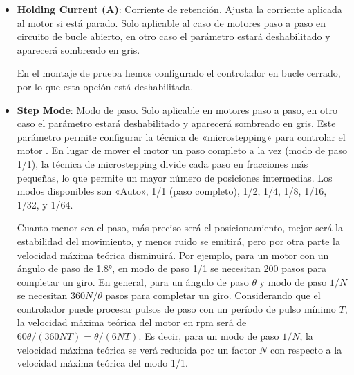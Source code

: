 \documentclass[english,spanish,a4paper,11pt]{article}
\begin{document}
\begin{itemize}
    \begin{admonition}{Importante}
        Al igual que en el parámetro anterior, este parámetro debe ser menor que la corriente máxima que pueda proporcionar la fuente de alimentación, teniendo también en cuenta las demás posibles cargas a las que deba suministrar potencia la fuente.
    \end{admonition}

    En el montaje de prueba, al igual que en el parámetro anterior, hemos establecido valores pequeños en este parámetro: 0.5 A para el motor paso a paso y 1 A para el motor sin escobillas.
    
    \item \textbf{Holding Current (A)}: Corriente de retención. Ajusta la corriente aplicada al motor si está parado. Solo aplicable al caso de motores paso a paso en circuito de bucle abierto, en otro caso el parámetro estará deshabilitado y aparecerá sombreado en gris.

    En el montaje de prueba hemos configurado el controlador en bucle cerrado, por lo que esta opción está deshabilitada.
    
    \item \textbf{Step Mode}: Modo de paso. Solo aplicable en motores paso a paso, en otro caso el parámetro estará deshabilitado y aparecerá sombreado en gris. Este parámetro permite configurar la técnica de «microstepping» para controlar el motor \cite{electricmotorsanddrives,enwiki:1166298756}. En lugar de mover el motor un paso completo a la vez (modo de paso 1/1), la técnica de microstepping divide cada paso en fracciones más pequeñas, lo que permite un mayor número de posiciones intermedias. Los modos disponibles son «Auto», 1/1 (paso completo), 1/2, 1/4, 1/8, 1/16, 1/32, y 1/64.
    
    Cuanto menor sea el paso, más preciso será el posicionamiento, mejor será la estabilidad del movimiento, y menos ruido se emitirá, pero por otra parte la velocidad máxima teórica disminuirá. Por ejemplo, para un motor con un ángulo de paso de \ang{1.8}, en modo de paso 1/1 se necesitan 200 pasos para completar un giro. En general, para un ángulo de paso $\theta$ y modo de paso $1/N$ se necesitan $360N/\theta$ pasos para completar un giro. Considerando que el controlador puede procesar pulsos de paso con un período de pulso mínimo $T$, la velocidad máxima teórica del motor en rpm será de $60\theta/(360NT) = \theta/(6NT)$. Es decir, para un modo de paso $1/N$, la velocidad máxima teórica se verá reducida por un factor $N$ con respecto a la velocidad máxima teórica del modo 1/1.
    

\end{itemize}
\end{document}
